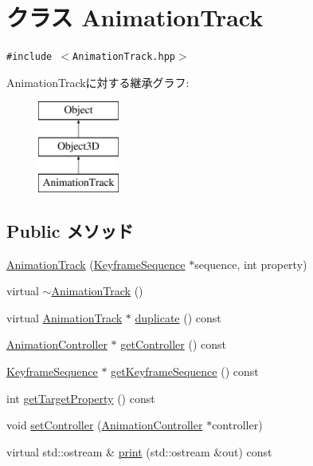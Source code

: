 \hypertarget{classm3g_1_1AnimationTrack}{
\section{クラス AnimationTrack}
\label{classm3g_1_1AnimationTrack}
}
{\tt \#include $<$AnimationTrack.hpp$>$}

AnimationTrackに対する継承グラフ:\begin{figure}[H]
\begin{center}
\leavevmode
\includegraphics[height=3cm]{classm3g_1_1AnimationTrack}
\end{center}
\end{figure}
\subsection*{Public メソッド}
\begin{CompactItemize}
\item 
\hyperlink{classm3g_1_1AnimationTrack_e27012f60e982597d6e504c488e51106}{AnimationTrack} (\hyperlink{classm3g_1_1KeyframeSequence}{KeyframeSequence} $\ast$sequence, int property)
\item 
virtual \hyperlink{classm3g_1_1AnimationTrack_f7f1bc360c298d4a2f2436889159205c}{$\sim$AnimationTrack} ()
\item 
virtual \hyperlink{classm3g_1_1AnimationTrack}{AnimationTrack} $\ast$ \hyperlink{classm3g_1_1AnimationTrack_e19aae30ee68ef05afd74ec9c19cf7d1}{duplicate} () const 
\item 
\hyperlink{classm3g_1_1AnimationController}{AnimationController} $\ast$ \hyperlink{classm3g_1_1AnimationTrack_3a54e89528127de5b4d0a48a2045a91c}{getController} () const 
\item 
\hyperlink{classm3g_1_1KeyframeSequence}{KeyframeSequence} $\ast$ \hyperlink{classm3g_1_1AnimationTrack_e83c81771a8329e1e5f978f228c0b308}{getKeyframeSequence} () const 
\item 
int \hyperlink{classm3g_1_1AnimationTrack_143de0bf90b434f1487caae5b0b66bbf}{getTargetProperty} () const 
\item 
void \hyperlink{classm3g_1_1AnimationTrack_639279dfdc74095fcb28d0c25aeec6df}{setController} (\hyperlink{classm3g_1_1AnimationController}{AnimationController} $\ast$controller)
\item 
virtual std::ostream \& \hyperlink{classm3g_1_1AnimationTrack_6fea17fa1532df3794f8cb39cb4f911f}{print} (std::ostream \&out) const 
\end{CompactItemize}
